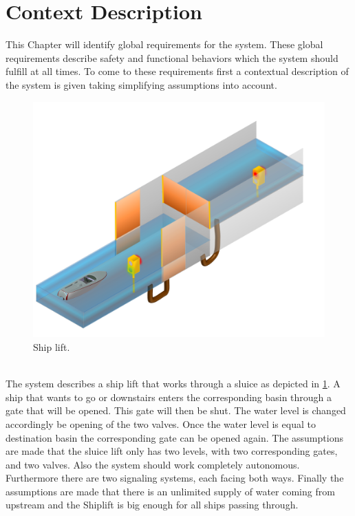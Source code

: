 
\section{Context Description}
This Chapter will identify global requirements for the system. These global requirements describe safety and functional behaviors which the system should fulfill at all times. To come to these requirements first a contextual description of the system is given taking simplifying assumptions into account.
\begin{figure}[!h]
	\includegraphics[width=\linewidth]{New}
	\caption{Ship lift.}
	\label{fig:boat1}
\end{figure}

\noindent
\\The system describes a ship lift that works through a sluice as depicted in \ref{fig:boat1}. A ship that wants to go or downstairs enters the corresponding basin through a gate that will be opened. This gate will then be shut. The water level is changed accordingly be opening of the two valves. Once the water level is equal to destination basin the corresponding gate can be opened again. The assumptions are made that the sluice lift only has two levels, with two corresponding gates, and two valves. Also the system should work completely autonomous. Furthermore there are two signaling systems, each facing both ways. Finally the assumptions are made that there is an unlimited supply of water coming from upstream and the Shiplift is big enough for all ships passing through. \\
\pagebreak


